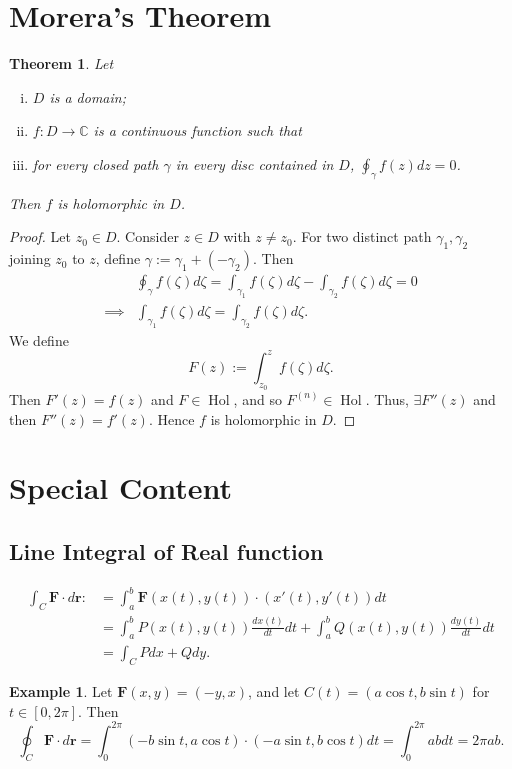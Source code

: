 \documentclass[12pt,openany]{book}
\newtheorem{theorem}{Theorem}[chapter]
\theoremstyle{definition}
\newtheorem{example}{Example}[section]
\newcommand{\C}{\mathbb{C}}
\newcommand{\of}[1]{\left( #1 \right)}
\newcommand{\Hol}{\operatorname{Hol}}
\begin{document}
	\section{Morera's Theorem}
	\begin{tcolorbox}[colback=white,colframe=thmcolor,arc=5pt,title={\color{white}\bf Morera's Theorem}]
		\begin{theorem}
			Let \begin{enumerate}[(i)]
				\item $D$ is a domain;
				\item $f:D\to\C$ is a continuous function such that
				\item for every closed path $\gamma$ in every disc contained in $D$, $\oint_\gamma f\of{z}dz=0$.
			\end{enumerate} Then $f$ is holomorphic in $D$.
		\end{theorem}
	\end{tcolorbox}
	\begin{proof}
		Let $z_0\in D$. Consider $z\in D$ with $z\neq z_0$. For two distinct path $\gamma_1,\gamma_2$ joining $z_0$ to $z$, define $\gamma:=\gamma_1+\of{-\gamma_2}$. Then \begin{align*}
			&\oint_\gamma f\of{\zeta}d\zeta=\int_{\gamma_1}f\of{\zeta}d\zeta-\int_{\gamma_2}f\of{\zeta}d\zeta=0\\
			\implies&\int_{\gamma_1}f\of{\zeta}d\zeta=\int_{\gamma_2}f\of{\zeta}d\zeta.
		\end{align*} We define \[
		F\of{z}:=\int_{z_0}^zf\of{\zeta}d\zeta.
		\] Then $F'\of{z}=f\of{z}$ and $F\in\Hol$, and so $F^{(n)}\in\Hol$. Thus, $\exists F''\of{z}$ and then $F''\of{z}=f'\of{z}$. Hence $f$ is holomorphic in $D$.
	\end{proof}
	
	\newpage
	\section{Special Content}
	\subsection{Line Integral of Real function}
	
	\begin{align*}
		\int_C\textbf{F}\cdot d\textbf{r}:&=\int_a^b\textbf{F}\of{x(t),y(t)}\cdot\of{x'(t),y'(t)}dt\\
		&=\int_a^bP\of{x(t),y(t)}\frac{dx(t)}{dt}dt+\int_a^bQ\of{x(t),y(t)}\frac{dy(t)}{dt}dt\\
		&=\int_C Pdx+Qdy.
	\end{align*}
	\vspace{4pt}
	\begin{example}
		Let $\textbf{F}(x,y)=\of{-y,x}$, and let $C\of{t}=\of{a\cos t,b\sin t}$ for $t\in[0,2\pi]$. Then \[
		\oint_C\textbf{F}\cdot d\textbf{r}=\int_0^{2\pi}\of{-b\sin t, a\cos t}\cdot\of{-a\sin t, b\cos t}dt=\int_0^{2\pi}ab dt=2\pi ab.
		\]
	\end{example}
	\vspace{8pt}
\end{document}
